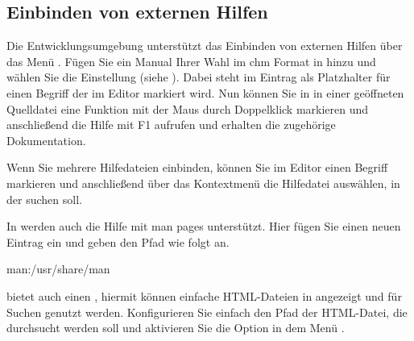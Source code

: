 

\subsection{Einbinden von externen Hilfen}

Die Entwicklungsumgebung \codeblocks unterstützt das Einbinden von externen Hilfen über das Menü . Fügen Sie ein Manual Ihrer Wahl im chm Format in  hinzu und wählen Sie die Einstellung  (siehe ). Dabei steht im Eintrag  als Platzhalter für einen Begriff der im Editor markiert wird.  Nun können Sie in \codeblocks in einer geöffneten Quelldatei eine Funktion mit der Maus durch Doppelklick markieren und anschließend die Hilfe mit F1 aufrufen und erhalten die zugehörige Dokumentation.

Wenn Sie mehrere Hilfedateien einbinden, können Sie im Editor einen Begriff markieren und anschließend über das Kontextmenü  die Hilfedatei auswählen, in der \codeblocks suchen soll.


In \codeblocks werden auch die Hilfe mit man pages unterstützt. Hier fügen Sie einen neuen Eintrag  ein und geben den Pfad wie folgt an.

\begin{cmd}
man:/usr/share/man
\end{cmd}

\codeblocks bietet auch einen , hiermit können  einfache HTML-Dateien in \codeblocks angezeigt und für Suchen genutzt werden. Konfigurieren Sie einfach den Pfad der HTML-Datei, die durchsucht werden soll und aktivieren Sie die Option  in dem Menü .


%

